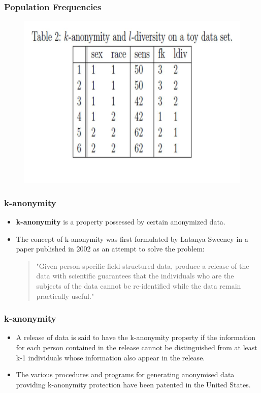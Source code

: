 \documentclass{beamer}
\begin{document}
	\begin{frame}	
		\frametitle{Population Frequencies}
		
\begin{figure}
\centering
\includegraphics[width=0.99\linewidth]{TemplJPGs2/Table2}
\caption{}
\label{fig:Table2}
\end{figure}


\end{frame}

\begin{frame}
	\frametitle{k-anonymity}
	\begin{itemize}
		\item \textbf{k-anonymity} is a property possessed by certain anonymized data. 
		\item The concept of k-anonymity was first formulated by Latanya Sweeney in a paper published in 2002 as an attempt to solve the problem: 
		\begin{quote}"Given person-specific field-structured data, produce a release of the data with scientific guarantees that the individuals who are the subjects of the data cannot be re-identified while the data remain practically useful."
		\end{quote}
	\end{itemize}
\end{frame}
\begin{frame}
	\frametitle{k-anonymity}
	\begin{itemize}
		\item A release of data is said to have the k-anonymity property if the information for each person contained in the release cannot be distinguished from at least k-1 individuals whose information also appear in the release. 
		\item The various procedures and programs for generating anonymised data providing k-anonymity protection have been patented in the United States.
	\end{itemize}
\end{frame}
\end{document}
